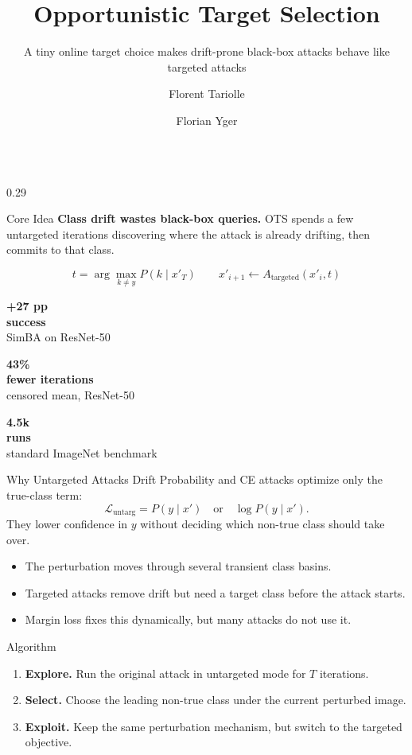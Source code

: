 \documentclass[final]{beamer}
\title{Opportunistic Target Selection}
\subtitle{A tiny online target choice makes drift-prone black-box attacks behave like targeted attacks}
\author{Florent Tariolle \and Florian Yger}
\institute{INSA Rouen Normandy \quad | \quad LITIS \quad | \quad CAp 2026}
\newcommand{\tightitem}{\setlength\itemsep{0.35em}}
\newcommand{\statbox}[3]{%
  \begin{minipage}[t]{0.31\linewidth}
    \centering
    {\fontsize{46}{50}\selectfont\bfseries #1}\\[-0.1cm]
    {\large\bfseries #2}\\[-0.05cm]
    {\small #3}
  \end{minipage}
}
\begin{document}
\begin{frame}[t]
\vspace{1.0cm}

\begin{columns}[t,totalwidth=0.92\paperwidth]

\begin{column}{0.29\paperwidth}

\begin{alertblock}{Core Idea}
\textbf{Class drift wastes black-box queries.} OTS spends a few untargeted iterations discovering where the attack is already drifting, then commits to that class.

\vspace{0.6cm}
\[
t = \arg\max_{k\neq y} P(k\mid x'_T)
\qquad
x'_{i+1} \leftarrow A_{\mathrm{targeted}}(x'_i,t)
\]

\vspace{0.6cm}
\begin{center}
\statbox{+27 pp}{success}{SimBA on ResNet-50}
\hfill
\statbox{43\%}{fewer iterations}{censored mean, ResNet-50}
\hfill
\statbox{4.5k}{runs}{standard ImageNet benchmark}
\end{center}
\end{alertblock}

\begin{block}{Why Untargeted Attacks Drift}
Probability and CE attacks optimize only the true-class term:
\[
\mathcal{L}_{\mathrm{untarg}} = P(y\mid x') \quad \text{or} \quad \log P(y\mid x').
\]
They lower confidence in $y$ without deciding which non-true class should take over.

\begin{itemize}
\tightitem
\item The perturbation moves through several transient class basins.
\item Targeted attacks remove drift but need a target class before the attack starts.
\item Margin loss fixes this dynamically, but many attacks do not use it.
\end{itemize}
\end{block}

\begin{block}{Algorithm}
\begin{enumerate}
\tightitem
\item \textbf{Explore.} Run the original attack in untargeted mode for $T$ iterations.
\item \textbf{Select.} Choose the leading non-true class under the current perturbed image.
\item \textbf{Exploit.} Keep the same perturbation mechanism, but switch to the targeted objective.
\end{enumerate}


\end{block}
\end{column}
\end{columns}
\end{frame}
\end{document}
